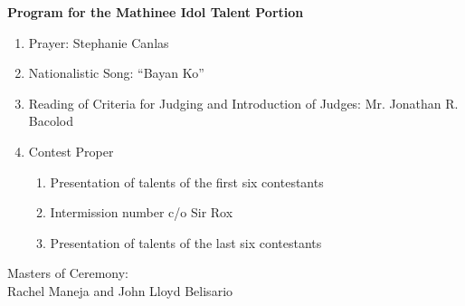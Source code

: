 \documentclass[11pt]{article}
\begin{document}
 

\begin{center}
\textbf{Program for the Mathinee Idol Talent Portion}
\end{center} 

\begin{enumerate}[label = \Roman*. ]
\item Prayer: Stephanie Canlas
\item Nationalistic Song: ``Bayan Ko''
\item Reading of Criteria for Judging and Introduction of Judges: Mr. Jonathan R. Bacolod 
\item Contest Proper 
\begin{enumerate}[label = \Alph*. ]
\item Presentation of talents of the first six contestants 
\item Intermission number c/o Sir Rox
\item Presentation of talents of the last six contestants 
\end{enumerate}   
\end{enumerate}  

\begin{center}
Masters of Ceremony: \\
Rachel Maneja and John Lloyd Belisario
\end{center} 
\end{document}
